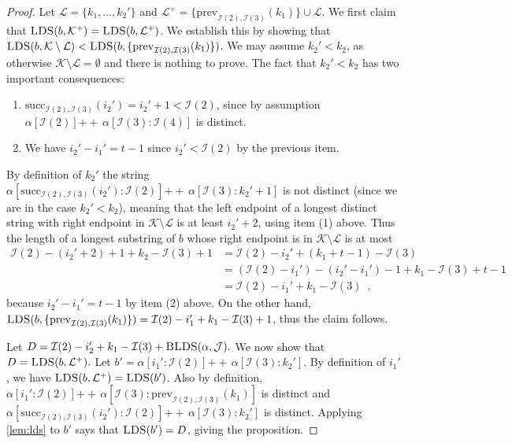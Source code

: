 \documentclass[12pt]{article}
\newcommand{\concat}{\ensuremath{+\!\!\!\!+\,}}
\newcommand{\Iset}{\mathcal{I}}
\newcommand{\Jset}{\mathcal{J}}
\newcommand{\Kset}{\mathcal{K}}
\newcommand{\Lset}{\mathcal{L}}
\newcommand{\blds}{\textsc{BLDS}}
\newcommand{\prev}{\mathrm{prev}}
\newcommand{\suc}{\mathrm{succ}}
\newcommand{\upto}{\mathbin{:}}
\newcommand{\lds}{\textsc{LDS}}
\theoremstyle{definition}
\begin{document}
\begin{proof}
Let $\Lset = \{k_1, \ldots, k_2'\}$ and $\Lset^+ = \{\prev_{\Iset(2), \Iset(3)}(k_1)\} \cup \Lset$.  
We first claim that $\lds(b, \Kset^+) = \lds(b, \Lset^+)$.
We establish this by showing that $\lds(b, \Kset \setminus \Lset) < \lds(b, \{\prev_{\Iset(2), \Iset(3)}(k_1)\})$.
We may assume $k_2' < k_2$, as otherwise $\Kset \setminus \Lset = \emptyset$ and there is nothing to prove.  The fact that $k_2' < k_2$ has two important consequences: 
\begin{enumerate}
\item $\suc_{\Iset(2), \Iset(3)}(i_2') = i_2' + 1 < \Iset(2)$, since by assumption $\alpha[\Iset(2)] \concat \alpha[\Iset(3) \upto \Iset(4)]$ is distinct.
\item We have $i_2' - i_1' = t - 1$ since $i_2' < \Iset(2)$ by the previous item.
\end{enumerate}

By definition of $k_2'$ the string $\alpha[\suc_{\Iset(2), \Iset(3)}(i_2') \upto \Iset(2)] \concat \alpha[\Iset(3) \upto k_2'+1]$ is not distinct (since we are in the case $k_2' < k_2$), meaning that the left endpoint of a longest distinct string with right endpoint in $\Kset \setminus \Lset$ is at least $i_2' + 2$, using item (1) above.
Thus the length of a longest substring of $b$ whose right endpoint is in $\Kset \setminus \Lset$ is at most 
\begin{align*}
\Iset(2) - (i_2' + 2) + 1 + k_2 - \Iset(3) + 1 &= \Iset(2) - i_2' + (k_1 + t - 1) - \Iset(3) \\
&= (\Iset(2) - i_1') - (i_2' - i_1') - 1 + k_1 - \Iset(3) + t - 1 \\
&= \Iset(2) - i_1' + k_1 - \Iset(3) \enspace,
\end{align*}
because $i_2' - i_1' = t - 1$ by item (2) above. On the other hand, $\lds(b, \{\prev_{\Iset(2), \Iset(3)}(k_1)\}) =  \Iset(2) - i_1' + k_1 - \Iset(3) + 1$, thus the claim follows.

Let $D = \Iset(2) - i_2' + k_1 - \Iset(3) + \blds(\alpha, \Jset).$
We now show that $D = \lds(b, \Lset^+).$
Let $b' = \alpha[i_1' \upto \Iset(2)] \concat \alpha[\Iset(3) \upto k_2'].$
By definition of $i_1'$, we have $\lds(b, \Lset^+) = \lds(b')$.
Also by definition, 
$\alpha[i_1' \upto \Iset(2)] \concat \alpha[\Iset(3) \upto \prev_{\Iset(2), \Iset(3)}(k_1)]$ is distinct and 
$\alpha[\suc_{\Iset(2), \Iset(3)}(i_2') \upto \Iset(2)] \concat \alpha[\Iset(3) \upto k_2']$ is distinct.  
Applying \cref{lem:lds} to $b'$ says that $\lds(b') = D$, giving the proposition.
\end{proof}
\end{document}
